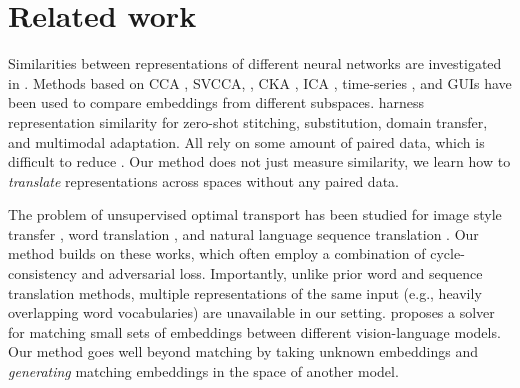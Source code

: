 \section{Related work}



Similarities between representations of
different neural networks are investigated in \citep{laakso2000content, li2016convergentlearningdifferentneural, wang2018understandinglearningrepresentationsextent, bansal2021revisitingmodelstitchingcompare, huh2024platonicrepresentationhypothesis, wolfram2025layers, li-etal-2024-vision-language}. Methods based on CCA \citep{morcos2018insightsrepresentationalsimilarityneural}, SVCCA, \citep{raghu2017svccasingularvectorcanonical}, CKA \citep{kornblith2019similarity, maniparambil2024vision}, ICA \citep{yamagiwa2023discoveringuniversalgeometryembeddings}, time-series \citep{mistry2023comparative}, and GUIs \citep{heimerl2019embComp} have been used to compare embeddings from different subspaces.  
\citep{maiorca2024latentspacetranslationsemantic, moschella2023relativerepresentationsenablezeroshot, moayeri2023texttoconceptandbackcrossmodel, tian2019latent, norelli2023asifcoupleddataturns} harness representation similarity for zero-shot stitching, substitution, domain transfer, and multimodal adaptation.  All rely on some amount of paired data, which is difficult  
to reduce \citep{cannistraci2023bootstrappingparallelanchorsrelative}.  Our method does not just measure similarity, we learn how to \emph{translate} representations across spaces without any paired data.


  The problem of unsupervised optimal transport has been studied for image style transfer \citep{huang2018multimodalunsupervisedimagetoimagetranslation, liu2018unsupervisedimagetoimagetranslationnetworks,zhu2020unpairedimagetoimagetranslationusing}, word translation \citep{xing2015normalized, conneau2018wordtranslationparalleldata, grave2018unsupervisedalignmentembeddingswasserstein, chen2018unsupervisedmultilingualwordembeddings, joulin-etal-2018-loss}, and natural language sequence translation \citep{raviknight2011deciphering, lample2018unsupervisedmachinetranslationusing, alvarezmelis2018gromovwassersteinalignmentwordembedding, artetxe2018unsupervisedneuralmachinetranslation, yang2018unsupervisedneuralmachinetranslation, artetxe-etal-2018-robust}.
Our method builds on these works, which often employ a combination of cycle-consistency and adversarial loss. Importantly, unlike prior word and sequence translation methods, multiple representations of the same input (e.g., heavily overlapping word vocabularies) are unavailable in our setting. \citep{schnaus2025itsblindmatchvisionlanguage} proposes a solver for matching small sets of embeddings between different vision-language models.
Our method goes well beyond matching by taking unknown embeddings and \emph{generating} matching embeddings in the space of another model.

